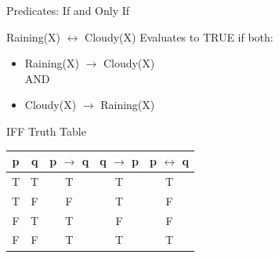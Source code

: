 \documentclass[aspectratio=169]{beamer}
\begin{document}
\begin{frame}{Predicates: If and Only If}

Raining(X) $\leftrightarrow$ Cloudy(X)
Evaluates to TRUE if both:
\begin{itemize}
\item Raining(X) $\rightarrow$ Cloudy(X)\\
AND
\item Cloudy(X) $\rightarrow$ Raining(X)\\
\end{itemize}

\vspace{2em}
IFF Truth Table\\
\begin{tabular}{|c|c|c|c||c|}  \hline
\textbf{p} & \textbf{q} & \textbf{p $\rightarrow$ q} & \textbf{q $\rightarrow$ p} & \textbf{p $\leftrightarrow$ q}\\ \hline
T & T & T &  T & T\\ \hline
T & F & F & T & F\\ \hline
F & T & T & F & F\\ \hline
F & F & T & T & T \\ \hline
\end{tabular}
\end{frame}





%
\end{document}
